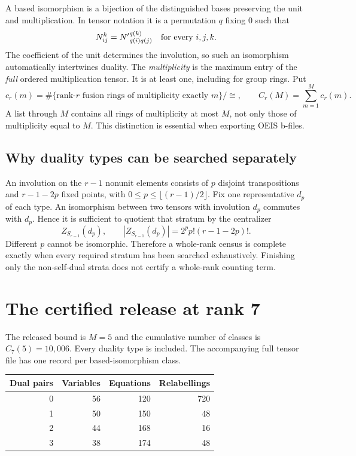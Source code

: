 \documentclass[11pt,a4paper]{article}
\theoremstyle{definition}\newtheorem{definition}[theorem]{Definition}\newtheorem{remark}[theorem]{Remark}
\begin{document}
A based isomorphism is a bijection of the distinguished bases preserving the
unit and multiplication. In tensor notation it is a permutation $q$ fixing $0$
such that
\[
 N_{ij}^{k}={N'}_{q(i)q(j)}^{q(k)}\quad\hbox{for every }i,j,k.
\]
The coefficient of the unit determines the involution, so such an isomorphism
automatically intertwines duality. The \emph{multiplicity} is the maximum entry
of the \emph{full} ordered multiplication tensor. It is at least one, including
for group rings. Put
\[
 c_r(m)=\#\{\text{rank-}r\text{ fusion rings of multiplicity exactly }m\}/\cong,
 \qquad C_r(M)=\sum_{m=1}^{M}c_r(m).
\]
A list through $M$ contains all rings of multiplicity at most $M$, not only
those of multiplicity equal to $M$. This distinction is essential when exporting
OEIS b-files.

\subsection{Why duality types can be searched separately}
An involution on the $r-1$ nonunit elements consists of $p$ disjoint transpositions
and $r-1-2p$ fixed points, with $0\leq p\leq\lfloor(r-1)/2\rfloor$. Fix one
representative $d_p$ of each type. An isomorphism between two tensors with
involution $d_p$ commutes with $d_p$. Hence it is sufficient to quotient that
stratum by the centralizer
\[
 Z_{S_{r-1}}(d_p),\qquad |Z_{S_{r-1}}(d_p)|=2^p p!(r-1-2p)!.
\]
Different $p$ cannot be isomorphic. Therefore a whole-rank census is complete
exactly when every required stratum has been searched exhaustively. Finishing
only the non-self-dual strata does not certify a whole-rank counting term.
\section{The certified release at rank 7}
The released bound is $M=5$ and the cumulative number of classes is $C_{7}(5)=10,006$. Every duality type is included. The accompanying full tensor file has one record per based-isomorphism class.

\begin{center}\begin{tabular}{rrrr}\toprule Dual pairs & Variables & Equations & Relabellings\\\midrule
0 & 56 & 120 & 720\\
1 & 50 & 150 & 48\\
2 & 44 & 168 & 16\\
3 & 38 & 174 & 48\\
\bottomrule\end{tabular}\end{center}
\end{document}
